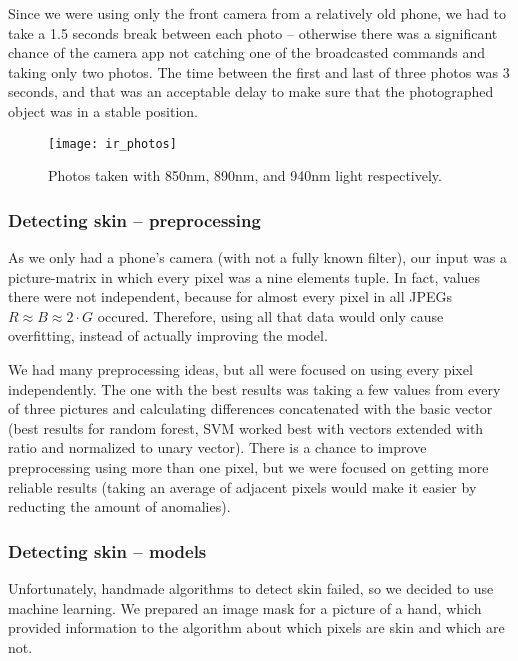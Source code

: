             Since we were using only the front camera from a relatively old phone,
            we had to take a 1.5 seconds break between each photo -- otherwise
            there was a significant chance of the camera app not catching one of the
            broadcasted commands and taking only two photos.
            The time between the first and last of three photos was 3 seconds,
            and that was an acceptable delay to make sure that the photographed
            object was in a stable position.

            \begin{figure}[H]
                \caption{Photos taken with 850nm, 890nm, and 940nm light respectively.}
                \centering
                \texttt{[image: ir\_photos]}
                \label{fig:ir_photos}
            \end{figure}

            \subsubsection*{Detecting skin -- preprocessing}
                As we only had a phone's camera (with not a fully known filter),
                our input was a picture-matrix
                in which every pixel was a nine elements tuple.
                In fact, values there were not independent, because
                for almost every pixel in all JPEGs
                $R \approx B \approx 2 \cdot G$ occured.
                Therefore, using all that data would only cause overfitting,
                instead of actually improving the model.

                We had many preprocessing ideas, but all were focused
                on using every pixel independently.
                The one with the best results was taking a few values from every of three pictures
                and calculating differences concatenated with the basic vector (best results for
                random forest, SVM worked best with vectors extended with ratio and normalized
                to unary vector).
                There is a chance to improve preprocessing using more than one pixel,
                but we were focused on getting more reliable results
                (taking an average of adjacent pixels would make it easier
                by reducting the amount of anomalies).

            \subsubsection*{Detecting skin -- models}
                Unfortunately, handmade algorithms to detect skin failed,
                so we decided to use machine learning.
                We prepared an image mask for a picture of a hand,
                which provided information to the algorithm
                about which pixels are skin and which are not.

